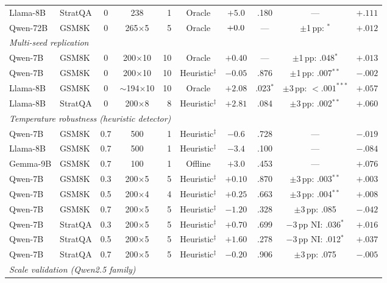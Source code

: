 \begin{table}[ht]
{\begin{tabular}{llccrccccc}
Llama-8B & StratQA & 0 & 238 & 1 & Oracle & $+5.0$ & .180 & --- & $+.111$ \\
Qwen-72B & GSM8K & 0 & 265$\times$5 & 5 & Oracle & $+0.0{}$ & --- & $\pm$1\,pp: \qwenSevenTwoBPvalue{}$^*$ & $+.012$ \\
\midrule
\multicolumn{10}{l}{\emph{Multi-seed replication}} \\
\midrule
Qwen-7B & GSM8K & 0 & 200$\times$10 & 10 & Oracle & $+0.40$ & --- & $\pm$1\,pp: .048$^*$ & $+.013$ \\
Qwen-7B & GSM8K & 0 & 200$\times$10 & 10 & Heuristic$^\ddagger$ & $-0.05$ & .876 & $\pm$1\,pp: .007$^{**}$ & $-.002$ \\
Llama-8B & GSM8K & 0 & ${\sim}$194$\times$10 & 10 & Oracle & $+2.08$ & .023$^*$ & $\pm$3\,pp: ${<}.001^{***}$ & $+.057$ \\
Llama-8B & StratQA & 0 & 200$\times$8 & 8 & Heuristic$^\ddagger$ & $+2.81$ & .084 & $\pm$3\,pp: .002$^{**}$ & $+.060$ \\
\midrule
\multicolumn{10}{l}{\emph{Temperature robustness (heuristic detector)}} \\
\midrule
Qwen-7B & GSM8K & 0.7 & 500 & 1 & Heuristic$^\ddagger$ & $-0.6$ & .728 & --- & $-.019$ \\
Llama-8B & GSM8K & 0.7 & 500 & 1 & Heuristic$^\ddagger$ & $-3.4$ & .100 & --- & $-.084$ \\
Gemma-9B & GSM8K & 0.7 & 100 & 1 & Offline & $+3.0$ & .453 & --- & $+.076$ \\
Qwen-7B & GSM8K & 0.3 & 200$\times$5 & 5 & Heuristic$^\ddagger$ & $+0.10$ & .870 & $\pm$3\,pp: .003$^{**}$ & $+.003$ \\
Qwen-7B & GSM8K & 0.5 & 200$\times$4 & 4 & Heuristic$^\ddagger$ & $+0.25$ & .663 & $\pm$3\,pp: .004$^{**}$ & $+.008$ \\
Qwen-7B & GSM8K & 0.7 & 200$\times$5 & 5 & Heuristic$^\ddagger$ & $-1.20$ & .328 & $\pm$3\,pp: .085 & $-.042$ \\
Qwen-7B & StratQA & 0.3 & 200$\times$5 & 5 & Heuristic$^\ddagger$ & $+0.70$ & .699 & $-$3\,pp NI: .036$^*$ & $+.016$ \\
Qwen-7B & StratQA & 0.5 & 200$\times$5 & 5 & Heuristic$^\ddagger$ & $+1.60$ & .278 & $-$3\,pp NI: .012$^*$ & $+.037$ \\
Qwen-7B & StratQA & 0.7 & 200$\times$5 & 5 & Heuristic$^\ddagger$ & $-0.20$ & .906 & $\pm$3\,pp: .075 & $-.005$ \\
\midrule
\multicolumn{10}{l}{\emph{Scale validation (Qwen2.5 family)}} \\

\end{tabular}}
\end{table}
